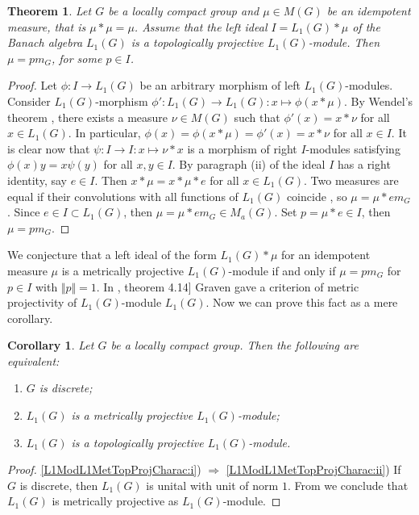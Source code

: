 \documentclass{article}
\theoremstyle{plain}
\newtheorem{theorem}{Theorem}[section]
\newtheorem{corollary}{Corollary}[section]
\theoremstyle{definition}
\newtheorem{proof}{Proof}\def\theproof{}
\newcommand{\convol}{\ast}
\begin{document}
\begin{fulltext}
\begin{theorem}\label{CommIdealByIdemMeasL1MetTopProjCharac} Let $G$ be a locally 
compact group and  $\mu\in M(G)$ be an idempotent measure, that is $\mu\convol\mu=\mu$. 
Assume that the left ideal $I=L_1(G)\convol\mu$ of the Banach algebra $L_1(G)$ is a 
topologically projective $L_1(G)$-module. Then $\mu=p m_G$, for some $p\in I$.
\end{theorem}
\begin{proof} Let $\phi:I\to L_1(G)$ be an arbitrary morphism of left $L_1(G)$-modules. 
Consider $L_1(G)$-morphism $\phi':L_1(G)\to L_1(G):x\mapsto\phi(x\convol\mu)$. By Wendel's 
theorem \cite[theorem 1]{WendLeftCentrzrs}, there exists a measure $\nu\in M(G)$ such 
that $\phi'(x)=x\convol\nu$ for all $x\in L_1(G)$. In particular, 
$\phi(x)=\phi(x\convol\mu)=\phi'(x)=x\convol\nu$ for all $x\in I$. It is clear now that 
$\psi:I\to I:x\mapsto\nu\convol x$ is a morphism of right $I$-modules satisfying 
$\phi(x)y=x\psi(y)$ for all $x,y\in I$. By paragraph \textup{(ii)} of 
\cite[lemma 2]{NemMetTopProjIdBanAlg} the ideal $I$ has a right identity, say 
$e\in I$. Then $x\convol\mu=x\convol\mu\convol e$ for all $x\in L_1(G)$. Two measures 
are equal if their convolutions with all functions of $L_1(G)$ coincide 
\cite[corollary 3.3.24]{DalBanAlgAutCont}, so $\mu=\mu\convol e m_G$. Since 
$e\in I\subset L_1(G)$, then $\mu=\mu\convol e m_G\in M_a(G)$. Set $p=\mu\convol e\in I$, 
then $\mu=p m_G$.
\end{proof}

We conjecture that a left ideal of the form $L_1(G)\convol \mu$ for an idempotent measure 
$\mu$ is a metrically projective $L_1(G)$-module if and only if $\mu=p m_G$ for $p\in I$ 
with $\Vert p\Vert=1$. In \cite{GravInjProjBanMod}, theorem 4.14] Graven gave a criterion of metric projectivity of $L_1(G)$-module $L_1(G)$. Now we can prove this fact as a mere corollary.

\begin{corollary}\label{L1ModL1MetTopProjCharac} Let $G$ be a locally compact group. Then 
the following are equivalent:
\begin{enumerate}
    \item $G$ is discrete;
    \label{L1ModL1MetTopProjCharac:i}
    \item $L_1(G)$ is a metrically projective $L_1(G)$-module;
    \label{L1ModL1MetTopProjCharac:ii}
    \item $L_1(G)$ is a topologically projective $L_1(G)$-module.
    \label{L1ModL1MetTopProjCharac:iii}
\end{enumerate}
\end{corollary}
\begin{proof} 
\ref{L1ModL1MetTopProjCharac:i}) $\Longrightarrow$ \ref{L1ModL1MetTopProjCharac:ii}) 
If $G$ is discrete, then $L_1(G)$ is unital 
with unit of norm $1$. From \cite[proposition 7]{NemMetTopProjIdBanAlg} we conclude that 
$L_1(G)$ is metrically projective as $L_1(G)$-module.


\end{proof}
\end{fulltext}
\end{document}
